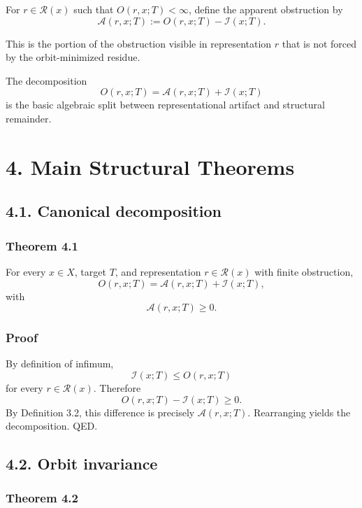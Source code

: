 \documentclass[
]{article}
\begin{document}
For \(r \in \mathcal{R}(x)\) such that \(O(r,x;T) < \infty\), define the
apparent obstruction by \[
\mathcal{A}(r,x;T) := O(r,x;T) - \mathcal{I}(x;T).
\]

This is the portion of the obstruction visible in representation \(r\)
that is not forced by the orbit-minimized residue.

The decomposition \[
O(r,x;T) = \mathcal{A}(r,x;T) + \mathcal{I}(x;T)
\] is the basic algebraic split between representational artifact and
structural remainder.

\section{4. Main Structural Theorems}\label{main-structural-theorems}

\subsection{4.1. Canonical decomposition}\label{canonical-decomposition}

\subsubsection{Theorem 4.1}\label{theorem-4.1}

For every \(x \in X\), target \(T\), and representation
\(r \in \mathcal{R}(x)\) with finite obstruction, \[
O(r,x;T) = \mathcal{A}(r,x;T) + \mathcal{I}(x;T),
\] with \[
\mathcal{A}(r,x;T) \ge 0.
\]

\subsubsection{Proof}\label{proof}

By definition of infimum, \[
\mathcal{I}(x;T) \le O(r,x;T)
\] for every \(r \in \mathcal{R}(x)\). Therefore \[
O(r,x;T) - \mathcal{I}(x;T) \ge 0.
\] By Definition 3.2, this difference is precisely
\(\mathcal{A}(r,x;T)\). Rearranging yields the decomposition. QED.

\subsection{4.2. Orbit invariance}\label{orbit-invariance}

\subsubsection{Theorem 4.2}\label{theorem-4.2}
\end{document}
